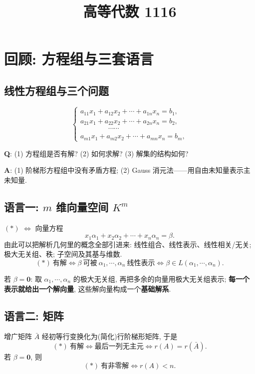 \documentclass[UTF8,11pt]{ctexart}
\title{高等代数 1116}
\date{}
\theoremstyle{cnthm}
\begin{document}
\maketitle

\section{回顾: 方程组与三套语言}

\subsection{线性方程组与三个问题}

\begin{equation*}
\begin{cases}
a_{11}x_1+a_{12}x_2+\cdots+a_{1n}x_n=b_1,\\
a_{21}x_1+a_{22}x_2+\cdots+a_{2n}x_n=b_2,\\
\qquad\qquad\cdots\cdots\\
a_{m1}x_1+a_{m2}x_2+\cdots+a_{mn}x_n=b_m,
\end{cases}
\tag{$*$}
\end{equation*}

\textbf{Q}: (1) 方程组是否有解? (2) 如何求解? (3) 解集的结构如何?

\textbf{A}: (1) 阶梯形方程组中没有矛盾方程; (2) Gauss 消元法——用自由未知量表示主未知量.

\subsection{语言一: $m$ 维向量空间 $K^m$}

$(*)$ $\iff$ 向量方程
\[
x_1\alpha_1+x_2\alpha_2+\cdots+x_n\alpha_n=\beta .
\]
由此可以把解析几何里的概念全部引进来: 线性组合、线性表示、线性相关/无关; 极大无关组、秩; 子空间及其基与维数.
\[
(*)\ \text{有解}\iff\beta\ \text{可被}\ \alpha_1,\cdots,\alpha_n\ \text{线性表示}
\iff \beta\in L(\alpha_1,\cdots,\alpha_n).
\]

若 $\beta=\mathbf 0$: 取 $\alpha_1,\cdots,\alpha_n$ 的极大无关组, 再把多余的向量用极大无关组表示; \textbf{每一个表示就给出一个解向量}, 这些解向量构成一个\textbf{基础解系}.

\subsection{语言二: 矩阵}

增广矩阵 $\bar A$ 经初等行变换化为(简化)行阶梯形矩阵, 于是
\[
(*)\ \text{有解}\iff\text{最后一列无主元}\iff r(A)=r(\bar A).
\]
若 $\beta=\mathbf 0$, 则
\[
(*)\ \text{有非零解}\iff r(A)<n .
\]
\end{document}
